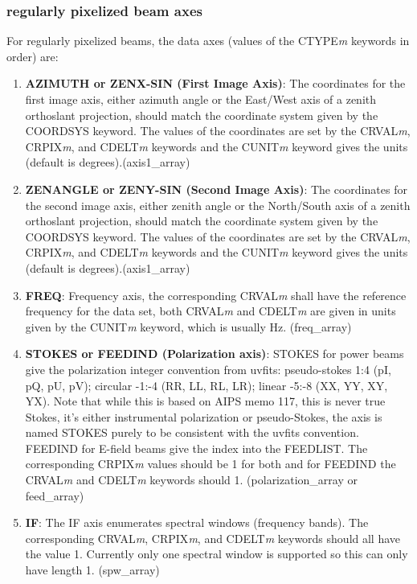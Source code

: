 \documentclass[11pt, oneside]{article}   	%
\begin{document}
\subsubsection{regularly pixelized beam axes}
For regularly pixelized beams, the data axes (values of the CTYPE\textit{m} keywords in order) are: 

\begin{enumerate}
\item{\textbf{AZIMUTH or ZENX-SIN (First Image Axis)}: The coordinates for the first image axis, either azimuth angle or the East/West axis of a zenith orthoslant projection, should match the coordinate system given by the COORDSYS keyword. The values of the coordinates are set by the CRVAL\textit{m}, CRPIX\textit{m}, and CDELT\textit{m} keywords and the CUNIT\textit{m} keyword gives the units (default is degrees).(axis1\_array)}
\item{\textbf{ZENANGLE or ZENY-SIN (Second Image Axis)}: The coordinates for the second image axis, either zenith angle or the North/South axis of a zenith orthoslant projection, should match the coordinate system given by the COORDSYS keyword. The values of the coordinates are set by the CRVAL\textit{m}, CRPIX\textit{m}, and CDELT\textit{m} keywords and the CUNIT\textit{m} keyword gives the units (default is degrees).(axis1\_array)}
\item{\textbf{FREQ}: Frequency axis, the corresponding CRVAL\textit{m} shall have the reference frequency for the data set, both CRVAL\textit{m} and CDELT\textit{m} are given in units given by the CUNIT\textit{m} keyword, which is usually Hz. (freq\_array)}
\item{\textbf{STOKES or FEEDIND (Polarization axis)}: STOKES for power beams give the polarization integer convention from uvfits: pseudo-stokes 1:4 (pI, pQ, pU, pV);  circular -1:-4 (RR, LL, RL, LR); linear -5:-8 (XX, YY, XY, YX). Note that while this is based on AIPS memo 117, this is never true Stokes, it's either instrumental polarization or pseudo-Stokes, the axis is named STOKES purely to be consistent with the uvfits convention.  FEEDIND for E-field beams give the index into the FEEDLIST. The corresponding CRPIX\textit{m} values should be 1 for both and for FEEDIND the CRVAL\textit{m} and CDELT\textit{m} keywords should 1. (polarization\_array or feed\_array)}
\item{\textbf{IF}: The IF axis enumerates spectral windows (frequency bands). The corresponding CRVAL\textit{m}, CRPIX\textit{m}, and CDELT\textit{m} keywords should all have the value 1. Currently only one spectral window is supported so this can only have length 1. (spw\_array)}

\end{enumerate}
\end{document}

